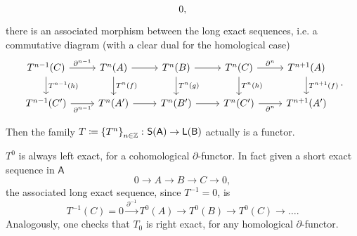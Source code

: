 \begin{defn}
\begin{enumerate}
\begin{equation}
\begin{tikzcd}
				0,
			\end{tikzcd}
			\end{equation} 
			there is an associated morphism between the long exact sequences, i.e.
			a commutative diagram (with a clear dual for the homological case)
			\begin{equation}
			\begin{tikzcd}
				T^{n-1}(C) \arrow[r, "\partial^{n-1}", rightarrow] \arrow[d, "T^{n-1}(h)", rightarrow] &
				T^n(A) \arrow[r, "", rightarrow] \arrow[d, "T^n(f)", rightarrow] &
				T^n(B) \arrow[r, "", rightarrow] \arrow[d, "T^n(g)", rightarrow] &
				T^n(C) \arrow[r, "\partial^n", rightarrow] \arrow[d, "T^n(h)", rightarrow] &
				T^{n+1}(A) \arrow[d, "T^{n+1}(f)", rightarrow] \\
				T^{n-1}(C') \arrow[r, "\partial^{n-1}"', rightarrow] &
				T^n(A') \arrow[r, "", rightarrow] &
				T^n(B') \arrow[r, "", rightarrow] &
				T^n(C') \arrow[r, "\partial^n"', rightarrow] &
				T^{n+1}(A')
			\end{tikzcd}
			.\end{equation} 
	\end{enumerate}
	Then the family $T \coloneqq \left\{ T^n \right\}_{n \in \mathbb{Z}}\colon\mathsf{S}(\mathsf{A}) \to \mathsf{L}(\mathsf{B})$
	actually is a functor.
\end{defn}

\begin{rem}[]
	$T^0$ is always left exact, for a cohomological $\partial$-functor.
	In fact given a short exact sequence in $\mathsf{A}$
	\begin{equation}
		0 \to A \to B \to C \to 0
	,\end{equation} 
	the associated long exact sequence, since $T^{-1} = 0$, is
	\begin{equation}
		T^{-1}(C) = 0 \xrightarrow{\partial^{-1}} T^0(A) \to T^0(B) \to T^0(C) \to \ldots
	.\end{equation} 
	Analogously, one checks that $T_0$ is right exact, for any
	homological $\partial$-functor.
\end{rem}

